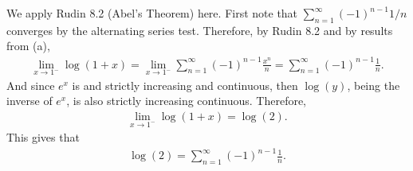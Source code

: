 \documentclass[12pt]{article}
\begin{document}
\begin{fproof}[1(b)]
We apply Rudin 8.2 (Abel's Theorem) here.
First note that \(\sum_{n=1}^{\infty} (-1)^{n-1}1/n\) converges by the alternating series test.
Therefore, by Rudin 8.2 and by results from (a),
\begin{align*}
    \lim_{x \to 1^-} \log(1+x) = \lim_{x \to 1^-} \sum_{n=1}^{\infty} (-1)^{n-1} \frac{x^n}{n}=  \sum_{n=1}^{\infty} (-1)^{n-1} \frac{1}{n}.
\end{align*}
And since \(e^x\) is and strictly increasing and continuous, then \(\log(y)\), being the inverse of \(e^x\), is also strictly increasing continuous. Therefore,
\begin{align*}
    \lim_{x \to 1^-} \log(1+x) = \log(2).
\end{align*}
This gives that
\begin{align*}
    \log(2) = \sum_{n=1}^{\infty} (-1)^{n-1} \frac{1}{n}. 
\end{align*}
\end{fproof}
\newpage

\begin{fproof}[2]

\end{fproof}
\newpage

\begin{fproof}[3(a)]
  
\end{fproof}

\begin{fproof}[3(b)]
  
\end{fproof}

\begin{fproof}[3(c)]
  
\end{fproof}
\newpage
\end{document}
